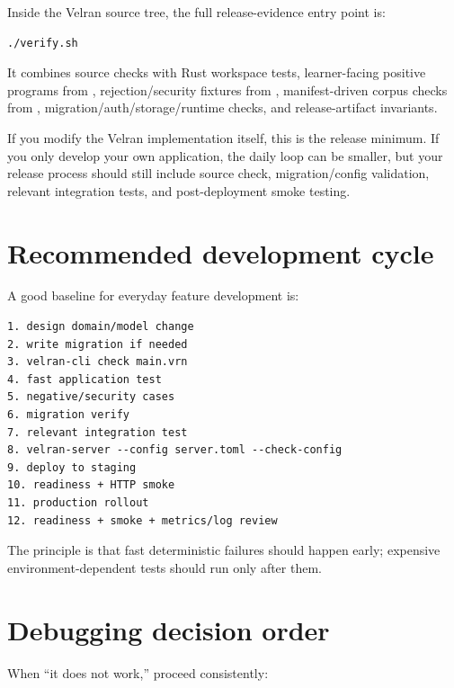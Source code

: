 Inside the Velran source tree, the full release-evidence entry point is:

\begin{lstlisting}
./verify.sh
\end{lstlisting}

It combines source checks with Rust workspace tests, learner-facing positive programs from , rejection/security fixtures from , manifest-driven corpus checks from , migration/auth/storage/runtime checks, and release-artifact invariants.

If you modify the Velran implementation itself, this is the release minimum. If you only develop your own  application, the daily loop can be smaller, but your release process should still include source check, migration/config validation, relevant integration tests, and post-deployment smoke testing.

\section{Recommended development cycle}

A good baseline for everyday feature development is:

\begin{lstlisting}
1. design domain/model change
2. write migration if needed
3. velran-cli check main.vrn
4. fast application test
5. negative/security cases
6. migration verify
7. relevant integration test
8. velran-server --config server.toml --check-config
9. deploy to staging
10. readiness + HTTP smoke
11. production rollout
12. readiness + smoke + metrics/log review
\end{lstlisting}

The principle is that fast deterministic failures should happen early; expensive environment-dependent tests should run only after them.

\section{Debugging decision order}

When ``it does not work,'' proceed consistently:


